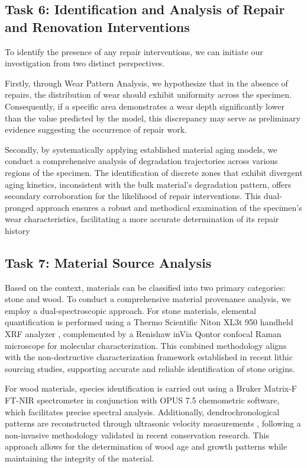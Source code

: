 \documentclass{mcmthesis}
\begin{document}
\subsection{Task 6: Identification and Analysis of Repair and Renovation Interventions}
\hspace{1.5em}To identify the presence of any repair interventions, we can initiate our investigation from two distinct perspectives. 

Firstly, through Wear Pattern Analysis, we hypothesize that in the absence of repairs, the distribution of wear should exhibit uniformity across the specimen. Consequently, if a specific area demonstrates a wear depth significantly lower than the value predicted by the model, this discrepancy may serve as preliminary evidence suggesting the occurrence of repair work.

Secondly, by systematically applying established material aging models, we conduct a comprehensive analysis of degradation trajectories across various regions of the specimen. The identification of discrete zones that exhibit divergent aging kinetics, inconsistent with the bulk material's degradation pattern, offers secondary corroboration for the likelihood of repair interventions. This dual-pronged approach ensures a robust and methodical examination of the specimen's wear characteristics, facilitating a more accurate determination of its repair history

\subsection{Task 7: Material Source Analysis}
\hspace{1.5em}Based on the context, materials can be classified into two primary categories: stone and wood. To conduct a comprehensive material provenance analysis, we employ a dual-spectroscopic approach. For stone materials, elemental quantification is performed using a Thermo Scientific Niton XL3t 950 handheld XRF analyzer \cite{3}, complemented by a Renishaw inVia Qontor confocal Raman microscope \cite{4} for molecular characterization. This combined methodology aligns with the non-destructive characterization framework established in recent lithic sourcing studies, supporting accurate and reliable identification of stone origins.

For wood materials, species identification is carried out using a Bruker Matrix-F FT-NIR spectrometer \cite{5} in conjunction with OPUS 7.5 chemometric software, which facilitates precise spectral analysis. Additionally, dendrochronological patterns are reconstructed through ultrasonic velocity measurements \cite{6}, following a non-invasive methodology validated in recent conservation research. This approach allows for the determination of wood age and growth patterns while maintaining the integrity of the material.
\end{document}
